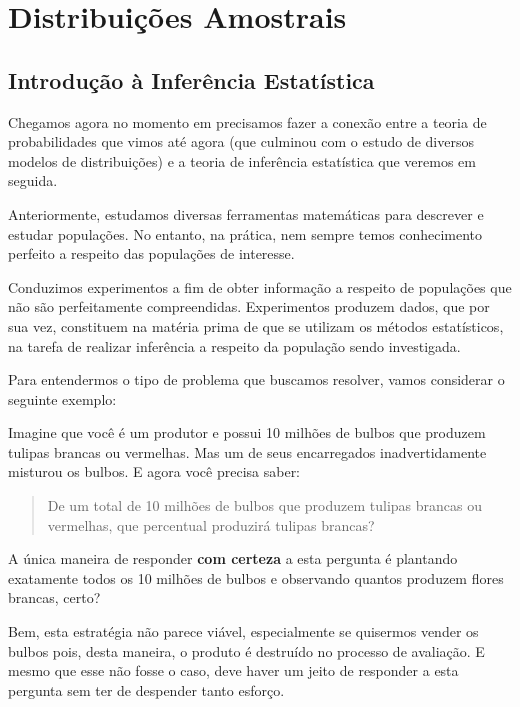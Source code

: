 \documentclass[
]{book}
\theoremstyle{definition}
\theoremstyle{definition}
\theoremstyle{definition}
\theoremstyle{remark}
\begin{document}
\hypertarget{distribuiuxe7uxf5es-amostrais}{%
\chapter{Distribuições Amostrais}\label{distribuiuxe7uxf5es-amostrais}}

\hypertarget{introduuxe7uxe3o-uxe0-inferuxeancia-estatuxedstica}{%
\section{Introdução à Inferência Estatística}\label{introduuxe7uxe3o-uxe0-inferuxeancia-estatuxedstica}}

Chegamos agora no momento em precisamos fazer a conexão entre a teoria de probabilidades que vimos até agora (que culminou com o estudo de diversos modelos de distribuições) e a teoria de inferência estatística que veremos em seguida.

Anteriormente, estudamos diversas ferramentas matemáticas para descrever e estudar populações. No entanto, na prática, nem sempre temos conhecimento perfeito a respeito das populações de interesse.

Conduzimos experimentos a fim de obter informação a respeito de populações que não são perfeitamente compreendidas. Experimentos produzem dados, que por sua vez, constituem na matéria prima de que se utilizam os métodos estatísticos, na tarefa de realizar inferência a respeito da população sendo investigada.

Para entendermos o tipo de problema que buscamos resolver, vamos considerar o seguinte exemplo:

Imagine que você é um produtor e possui 10 milhões de bulbos que produzem tulipas brancas ou vermelhas. Mas um de seus encarregados inadvertidamente misturou os bulbos.
E agora você precisa saber:

\begin{quote}
De um total de 10 milhões de bulbos que produzem tulipas brancas ou vermelhas, que percentual produzirá tulipas brancas?
\end{quote}

A única maneira de responder \textbf{com certeza} a esta pergunta é plantando exatamente todos os 10 milhões de bulbos e observando quantos produzem flores brancas, certo?

Bem, esta estratégia não parece viável, especialmente se quisermos vender os bulbos pois, desta maneira, o produto é destruído no processo de avaliação. E mesmo que esse não fosse o caso, deve haver um jeito de responder a esta pergunta sem ter de despender tanto esforço.
\end{document}
